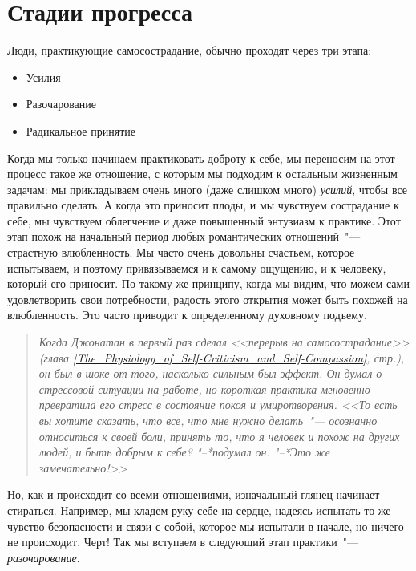 
\chapter{Стадии прогресса} \label{Stages_of_Progress}

Люди, практикующие самосострадание, обычно проходят через три этапа:
\begin{itemize}
	\item Усилия
	\item Разочарование
	\item Радикальное принятие
\end{itemize}

Когда мы только начинаем практиковать доброту к себе, мы переносим на этот процесс такое же отношение, с которым мы подходим к остальным жизненным задачам: мы прикладываем очень много (даже слишком много) \emph{усилий}, чтобы все правильно сделать. А когда это приносит плоды, и мы чувствуем сострадание к себе, мы чувствуем облегчение и даже повышенный энтузиазм к практике. Этот этап похож на начальный период любых романтических отношений~"--- страстную влюбленность. Мы часто очень довольны счастьем, которое испытываем, и поэтому привязываемся и к самому ощущению, и к человеку, который его приносит. По такому же принципу, когда мы видим, что можем сами удовлетворить свои потребности, радость этого открытия может быть похожей на влюбленность. Это часто приводит к определенному духовному подъему. 

\begin{quotation}
	\textit{
		Когда Джонатан в первый раз сделал <<перерыв на самосострадание>> (глава \ref{The_Physiology_of_Self-Criticism_and_Self-Compassion}, стр.\:\pageref{IP:Self-Compassion_Break}), он был в шоке от того, насколько сильным был эффект. Он думал о стрессовой ситуации на работе, но короткая практика мгновенно превратила его стресс в состояние покоя и умиротворения. <<То есть вы хотите сказать, что все, что мне нужно делать~"--- осознанно относиться к своей боли, принять то, что я человек и похож на других людей, и быть добрым к себе? "--*подумал он. "--*Это же замечательно!>>
	}
\end{quotation}

Но, как и происходит со всеми отношениями, изначальный глянец начинает стираться. Например, мы кладем руку себе на сердце, надеясь испытать то же чувство безопасности и связи с собой, которое мы испытали в начале, но ничего не происходит. Черт! Так мы вступаем в следующий этап практики~"--- \emph{разочарование}.

